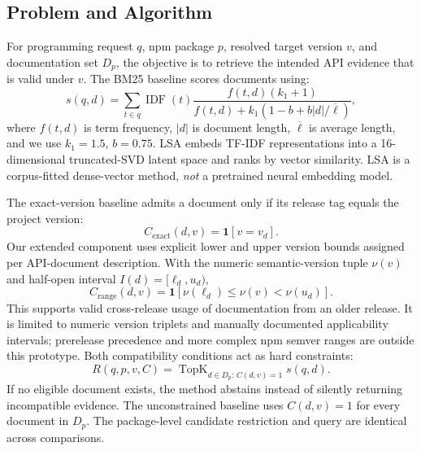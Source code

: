 \documentclass[conference]{IEEEtran}
\begin{document}
\subsection{Problem and Algorithm}
For programming request $q$, npm package $p$, resolved target version $v$, and documentation set $D_p$, the objective is to retrieve the intended API evidence that is valid under $v$. The BM25 baseline scores documents using:
\begin{equation}
 s(q,d)=\sum_{t\in q}\operatorname{IDF}(t)
 \frac{f(t,d)(k_1+1)}{f(t,d)+k_1(1-b+b|d|/\overline{\ell})},
\end{equation}
where $f(t,d)$ is term frequency, $|d|$ is document length, $\overline{\ell}$ is average length, and we use $k_1=1.5$, $b=0.75$. LSA embeds TF-IDF representations into a 16-dimensional truncated-SVD latent space and ranks by vector similarity. LSA is a corpus-fitted dense-vector method, \emph{not} a pretrained neural embedding model.

The exact-version baseline admits a document only if its release tag equals the project version:
\begin{equation}
 C_{\mathrm{exact}}(d,v) = \mathbf{1}[v=v_d].
\end{equation}
Our extended component uses explicit lower and upper version bounds assigned per API-document description. With the numeric semantic-version tuple $\nu(v)$ and half-open interval $I(d)=[\ell_d,u_d)$,
\begin{equation}
 C_{\mathrm{range}}(d,v) =
 \mathbf{1}[\nu(\ell_d)\le\nu(v)<\nu(u_d)].
\end{equation}
This supports valid cross-release usage of documentation from an older release. It is limited to numeric version triplets and manually documented applicability intervals; prerelease precedence and more complex npm semver ranges are outside this prototype. Both compatibility conditions act as hard constraints:
\begin{equation}
 R(q,p,v,C) = \operatorname{TopK}_{d\in D_p:\,C(d,v)=1}s(q,d).
\end{equation}
If no eligible document exists, the method abstains instead of silently returning incompatible evidence. The unconstrained baseline uses $C(d,v)=1$ for every document in $D_p$. The package-level candidate restriction and query are identical across comparisons.
\end{document}
